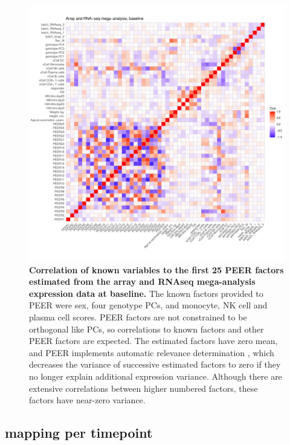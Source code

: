 \begin{figure}
    \centering
    \includegraphics[width=1.0\textwidth,page=1]{mainmatter/figures/chapter_03/peer_plotting.mega_v2.pdf}
    \caption{
        \textbf{Correlation of known variables to the first 25 PEER factors estimated from the array and \gls{RNAseq} mega-analysis expression data at baseline.}
        The known factors provided to PEER were sex, four genotype \glspl{PC}, and monocyte, \gls{NK} cell and plasma cell  scores.
        PEER factors are not constrained to be orthogonal like \glspl{PC}, so correlations to known factors and other PEER factors are expected.
        The estimated factors have zero mean, and PEER implements automatic relevance determination \autocite{stegle2012UsingProbabilisticEstimation}, which decreases the variance of successive estimated factors to zero if they no longer explain additional expression variance.
        Although there are extensive correlations between higher numbered factors, these factors have near-zero variance.
    }
    \label{fig:hird_peer_corMatrix_v2_mega}
\end{figure}

\subsection{ mapping per timepoint}
\label{subsec:hird_reQTL_limix}

